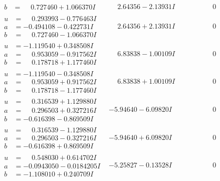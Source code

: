 \documentclass[1p]{elsarticle_modified}
\theoremstyle{definition}
\begin{document}
$$\begin{array}{c|c|c}
\begin{aligned}
b &= \phantom{-}0.727460 + 1.066370 I\end{aligned}
 & \phantom{-}2.64356 - 2.13931 I & \phantom{-0.000000 } 0 \\ \hline\begin{aligned}
u &= \phantom{-}0.293993 - 0.776463 I \\
a &= -0.494108 - 0.422731 I \\
b &= \phantom{-}0.727460 - 1.066370 I\end{aligned}
 & \phantom{-}2.64356 + 2.13931 I & \phantom{-0.000000 } 0 \\ \hline\begin{aligned}
u &= -1.119540 + 0.348508 I \\
a &= \phantom{-}0.953059 - 0.917562 I \\
b &= \phantom{-}0.178718 + 1.177460 I\end{aligned}
 & \phantom{-}6.83838 - 1.00109 I & \phantom{-0.000000 } 0 \\ \hline\begin{aligned}
u &= -1.119540 - 0.348508 I \\
a &= \phantom{-}0.953059 + 0.917562 I \\
b &= \phantom{-}0.178718 - 1.177460 I\end{aligned}
 & \phantom{-}6.83838 + 1.00109 I & \phantom{-0.000000 } 0 \\ \hline\begin{aligned}
u &= \phantom{-}0.316539 + 1.129880 I \\
a &= \phantom{-}0.296503 + 0.327216 I \\
b &= -0.616398 - 0.869509 I\end{aligned}
 & -5.94640 - 6.09820 I & \phantom{-0.000000 } 0 \\ \hline\begin{aligned}
u &= \phantom{-}0.316539 - 1.129880 I \\
a &= \phantom{-}0.296503 - 0.327216 I \\
b &= -0.616398 + 0.869509 I\end{aligned}
 & -5.94640 + 6.09820 I & \phantom{-0.000000 } 0 \\ \hline\begin{aligned}
u &= \phantom{-}0.548030 + 0.614702 I \\
a &= -0.0943050 - 0.0184205 I \\
b &= -1.108010 + 0.240709 I\end{aligned}
 & -5.25827 - 0.13528 I & \phantom{-0.000000 } 0 \\ \hline\begin{aligned}

\end{aligned}
\end{array}$$
\end{document}
